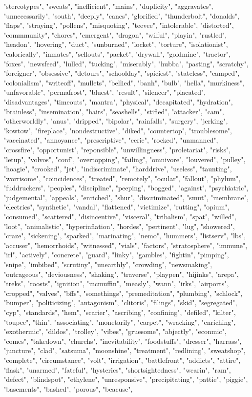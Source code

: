 "stereotypes", "sweats", "inefficient", "mains", "duplicity", "aggravates", "unnecessarily", "south", "deeply", "canes", "glorified", "thunderbolt", "donalds", "flaps", "straying", "pollens", "misquoting", "teevee", "intolerable", "distorted", "commmunity", "chores", "emergent", "dragon", "wilful", "playin", "rustled", "headon", "hovering", "duct", "sunburned", "locket", "torture", "isolationist", "calorically", "inmates", "sellouts", "packet", "drywall", "goldmine", "tractor", "foxes", "newsfeed", "lulled", "tucking", "miserably", "hubba", "pasting", "scratchy", "foreigner", "obsessive", "detours", "schoolday", "spiciest", "stateless", "camped", "colonialism", "writeoff", "mullets", "bellied", "banh", "bulb", "hella", "murkiness", "unfavorable", "permafrost", "bluest", "result", "silencer", "placated", "disadvantages", "timeouts", "mantra", "physical", "decapitated", "hydration", "brainless", "insemination", "hairs", "seashells", "stifled", "attacker", "cam", "otherworldly", "anus", "dripped", "bipolar", "rainfalls", "surgery", "jerking", "kowtow", "fireplace", "nondestructive", "diked", "countertop", "troublesome", "vaccinated", "annoyance", "prescriptive", "eerie", "rocked", "unmanned", "crossfire", "opportunist", "reponsible", "unwillingness", "proletariat", "risks", "letup", "volvos", "conf", "overtopping", "failing", "omnivore", "louvered", "pulley", "hoagie", "crooked", "jet", "indiscriminate", "harddrive", "useless", "taunting", "worrisome", "coincidences", "treated", "remotely", "ocular", "fallout", "phylum", "fuddruckers", "peoples", "discipline", "peeping", "bogged", "against", "psychiatric", "judgemental", "appeals", "enriched", "shur", "discriminated", "smut", "membrane", "electrics", "synthetic", "vandal", "flattened", "victimize", "rutting", "opium", "consumed", "scattered", "disincentive", "visceral", "tribalism", "spat", "willed", "loot", "animalistic", "hyperinflation", "hordes", "pertinent", "lug", "showered", "craze", "sickening", "sparked", "marinating", "nemo", "hummers", "listserv", "lbs", "accuser", "hemorrhoids", "witnessed", "vials", "factors", "stratosphere", "immune", "irl", "actively", "concrete", "guard", "linky", "gambles", "fightin", "pimping", "snipe", "imbibed", "scrutiny", "unearthly", "crowding", "newsmaking", "outrageous", "deviousness", "shaking", "traverse", "playpen", "hijinks", "arepa", "treks", "roosts", "ignition", "mcmuffin", "measly", "wann", "irks", "airports", "cropped", "valves", "bffs", "somethings", "premeditation", "plumbing", "schlock", "bumper", "politicizing", "antagonism", "clitoris", "filings", "skid", "segregated", "cyp", "standards", "hem", "scarier", "ascribing", "confining", "defiled", "kilter", "toupee", "thin", "associating", "monetarily", "carpet", "wracking", "enriching", "exothermic", "dildos", "trolley", "vibes", "gruesome", "abjectly", "econmic", "comes", "takedown", "churchs", "inevitability", "foodstuffs", "dresser", "harrass", "juncture", "clad", "satsuma", "moonshine", "treatment", "redlining", "sweatshop", "complete", "circumstance", "volt", "irrigation", "battlefront", "addicts", "attire", "flask", "unarmed", "fateful", "hysterics", "shortsightedness", "wearin", "ram", "defect", "blindspot", "ethylene", "unresponsive", "precipitating", "pattie", "piggie", "basements", "bashed", "porous", "beacuse", 